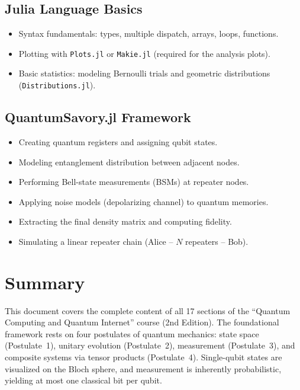 \documentclass[10pt,a4paper]{article}
\begin{document}
\subsection{Julia Language Basics}

\begin{itemize}[nosep]
\item Syntax fundamentals: types, multiple dispatch, arrays, loops, functions.
\item Plotting with \texttt{Plots.jl} or \texttt{Makie.jl} (required for the analysis plots).
\item Basic statistics: modeling Bernoulli trials and geometric distributions (\texttt{Distributions.jl}).
\end{itemize}

\subsection{QuantumSavory.jl Framework}

\begin{itemize}[nosep]
\item Creating quantum registers and assigning qubit states.
\item Modeling entanglement distribution between adjacent nodes.
\item Performing Bell-state measurements (BSMs) at repeater nodes.
\item Applying noise models (depolarizing channel) to quantum memories.
\item Extracting the final density matrix and computing fidelity.
\item Simulating a linear repeater chain (Alice -- $N$ repeaters -- Bob).
\end{itemize}

\section{Summary}

This document covers the complete content of all 17 sections of the ``Quantum Computing and Quantum Internet'' course (2nd Edition). The foundational framework rests on four postulates of quantum mechanics: state space (Postulate~1), unitary evolution (Postulate~2), measurement (Postulate~3), and composite systems via tensor products (Postulate~4). Single-qubit states are visualized on the Bloch sphere, and measurement is inherently probabilistic, yielding at most one classical bit per qubit.
\end{document}
